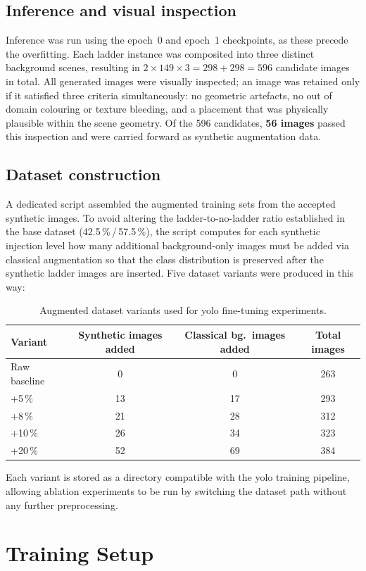 \subsection*{Inference and visual inspection}
Inference was run using the epoch~0 and epoch~1 checkpoints, as these precede the overfitting. Each ladder instance was composited into 
three distinct background scenes, resulting in $2 \times 149 \times 3 = 298 + 298 = 596$ candidate images in total. All generated images were visually inspected; 
an image was retained only if it satisfied three criteria simultaneously: no geometric artefacts, no out of domain colouring or texture bleeding, and a placement that was physically plausible within the scene geometry. 
Of the 596 candidates, \textbf{56 images} passed this inspection and were carried forward as synthetic augmentation data.

\subsection*{Dataset construction}
A dedicated script assembled the augmented training sets from the accepted synthetic images. 
To avoid altering the ladder-to-no-ladder ratio established in the base dataset (42.5\,\%\,/\,57.5\,\%), the script computes for each synthetic injection level how many additional background-only images 
must be added via classical augmentation so that the class distribution is preserved after the synthetic ladder images are inserted. 
Five dataset variants were produced in this way:

\begin{table}[!htbp]
  \centering
  \caption{Augmented dataset variants used for \gls{yolo} fine-tuning experiments.}
  \label{tab:datasets}
  \begin{tabular}{@{} l c c c @{}}
    \toprule
    Variant & Synthetic images added & Classical bg.\ images added & Total images \\
    \midrule
    Raw baseline &  0  &  0  & 263 \\
    +5\,\%       & 13  & 17  & 293 \\
    +8\,\%       & 21  & 28  & 312 \\
    +10\,\%      & 26  & 34  & 323 \\
    +20\,\%      & 52  & 69  & 384 \\
    \bottomrule
  \end{tabular}
\end{table}

Each variant is stored as a directory compatible with the \gls{yolo} training pipeline, allowing ablation experiments to be run by switching the dataset 
path without any further preprocessing.

\section{Training Setup}


